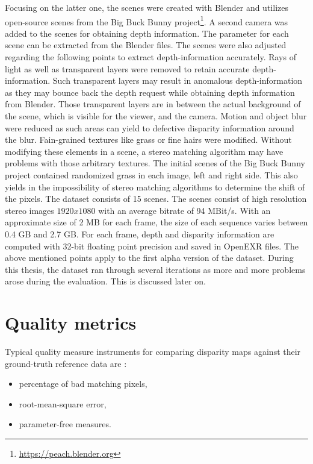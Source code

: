 \noindent Focusing on the latter one, the scenes were created with Blender and utilizes open-source scenes from the Big Buck Bunny project\footnote{\url{https://peach.blender.org}}.
A second camera was added to the scenes for obtaining depth information.
The parameter for each scene can be extracted from the Blender files.
The scenes were also adjusted regarding the following points to extract depth-information accurately.
Rays of light as well as transparent layers were removed to retain accurate depth-information.
Such transparent layers may result in anomalous depth-information as they may bounce back the depth request while obtaining depth information from Blender.
Those transparent layers are in between the actual background of the scene, which is visible for the viewer, and the camera.
Motion and object blur were reduced as such areas can yield to defective disparity information around the blur.
Fain-grained textures like grass or fine hairs were modified.
Without modifying these elements in a scene, a stereo matching algorithm may have problems with those arbitrary textures.
The initial scenes of the Big Buck Bunny project contained randomized grass in each image, left and right side.
This also yields in the impossibility of stereo matching algorithms to determine the shift of the pixels.
\newline\newline\noindent The dataset consists of 15 scenes.
The scenes consist of high resolution stereo images $1920x1080$ with an average bitrate of 94 MBit/s.
With an approximate size of 2 MB for each frame, the size of each sequence varies between 0.4 GB and 2.7 GB.
For each frame, depth and disparity information are computed with 32-bit floating point precision and saved in OpenEXR files.
The above mentioned points apply to the first alpha version of the dataset.
During this thesis, the dataset ran through several iterations as more and more problems arose during the evaluation.
This is discussed later on.

\section{Quality metrics}

Typical quality measure instruments for comparing disparity maps against their ground-truth reference data are  \citep{cyganek2011introduction}:

\begin{itemize}
  \item percentage of bad matching pixels,
  \item root-mean-square error,
  \item parameter-free measures.
\end{itemize}


